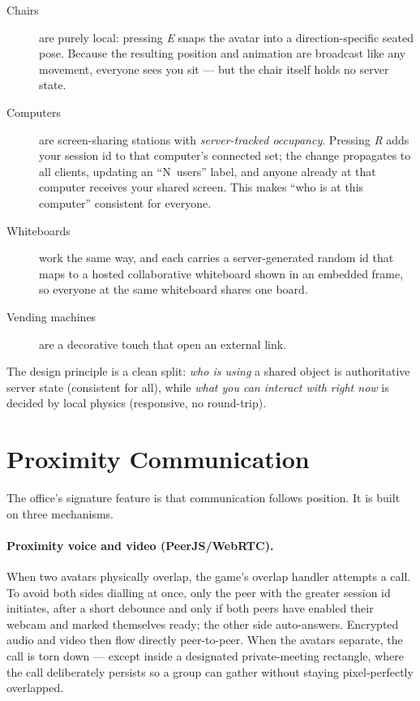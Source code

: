 \begin{description}
  \item[Chairs] are purely local: pressing \emph{E} snaps the avatar into a
  direction-specific seated pose. Because the resulting position and animation are
  broadcast like any movement, everyone sees you sit --- but the chair itself
  holds no server state.
  \item[Computers] are screen-sharing stations with \emph{server-tracked
  occupancy}. Pressing \emph{R} adds your session id to that computer's connected
  set; the change propagates to all clients, updating an ``N~users'' label, and
  anyone already at that computer receives your shared screen. This makes ``who is
  at this computer'' consistent for everyone.
  \item[Whiteboards] work the same way, and each carries a server-generated random
  id that maps to a hosted collaborative whiteboard shown in an embedded frame, so
  everyone at the same whiteboard shares one board.
  \item[Vending machines] are a decorative touch that open an external link.
\end{description}

The design principle is a clean split: \emph{who is using} a shared object is
authoritative server state (consistent for all), while \emph{what you can interact
with right now} is decided by local physics (responsive, no round-trip).

\section{Proximity Communication}

The office's signature feature is that communication follows position. It is built
on three mechanisms.

\paragraph{Proximity voice and video (PeerJS/WebRTC).} When two avatars physically
overlap, the game's overlap handler attempts a call. To avoid both sides dialling
at once, only the peer with the greater session id initiates, after a short
debounce and only if both peers have enabled their webcam and marked themselves
ready; the other side auto-answers. Encrypted audio and video then flow directly
peer-to-peer. When the avatars separate, the call is torn down --- except inside a
designated private-meeting rectangle, where the call deliberately persists so a
group can gather without staying pixel-perfectly overlapped.

